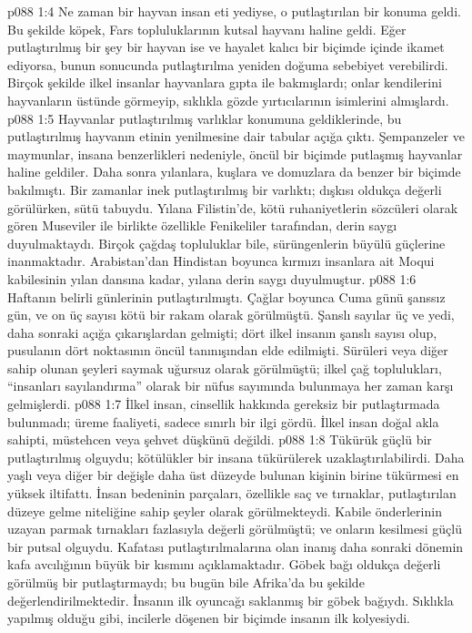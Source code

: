 \vs p088 1:4 Ne zaman bir hayvan insan eti yediyse, o putlaştırılan bir konuma geldi. Bu şekilde köpek, Fars topluluklarının kutsal hayvanı haline geldi. Eğer putlaştırılmış bir şey bir hayvan ise ve hayalet kalıcı bir biçimde içinde ikamet ediyorsa, bunun sonucunda putlaştırılma yeniden doğuma sebebiyet verebilirdi. Birçok şekilde ilkel insanlar hayvanlara gıpta ile bakmışlardı; onlar kendilerini hayvanların üstünde görmeyip, sıklıkla gözde yırtıcılarının isimlerini almışlardı.
\vs p088 1:5 Hayvanlar putlaştırılmış varlıklar konumuna geldiklerinde, bu putlaştırılmış hayvanın etinin yenilmesine dair tabular açığa çıktı. Şempanzeler ve maymunlar, insana benzerlikleri nedeniyle, öncül bir biçimde putlaşmış hayvanlar haline geldiler. Daha sonra yılanlara, kuşlara ve domuzlara da benzer bir biçimde bakılmıştı. Bir zamanlar inek putlaştırılmış bir varlıktı; dışkısı oldukça değerli görülürken, sütü tabuydu. Yılana Filistin’de, kötü ruhaniyetlerin sözcüleri olarak gören Museviler ile birlikte özellikle Fenikeliler tarafından, derin saygı duyulmaktaydı. Birçok çağdaş topluluklar bile, sürüngenlerin büyülü güçlerine inanmaktadır. Arabistan’dan Hindistan boyunca kırmızı insanlara ait Moqui kabilesinin yılan dansına kadar, yılana derin saygı duyulmuştur.
\vs p088 1:6 Haftanın belirli günlerinin putlaştırılmıştı. Çağlar boyunca Cuma günü şanssız gün, ve on üç sayısı kötü bir rakam olarak görülmüştü. Şanslı sayılar üç ve yedi, daha sonraki açığa çıkarışlardan gelmişti; dört ilkel insanın şanslı sayısı olup, pusulanın dört noktasının öncül tanınışından elde edilmişti. Sürüleri veya diğer sahip olunan şeyleri saymak uğursuz olarak görülmüştü; ilkel çağ toplulukları, “insanları sayılandırma” olarak bir nüfus sayımında bulunmaya her zaman karşı gelmişlerdi.
\vs p088 1:7 İlkel insan, cinsellik hakkında gereksiz bir putlaştırmada bulunmadı; üreme faaliyeti, sadece sınırlı bir ilgi gördü. İlkel insan doğal akla sahipti, müstehcen veya şehvet düşkünü değildi.
\vs p088 1:8 Tükürük güçlü bir putlaştırılmış olguydu; kötülükler bir insana tükürülerek uzaklaştırılabilirdi. Daha yaşlı veya diğer bir değişle daha üst düzeyde bulunan kişinin birine tükürmesi en yüksek iltifattı. İnsan bedeninin parçaları, özellikle saç ve tırnaklar, putlaştırılan düzeye gelme niteliğine sahip şeyler olarak görülmekteydi. Kabile önderlerinin uzayan parmak tırnakları fazlasıyla değerli görülmüştü; ve onların kesilmesi güçlü bir putsal olguydu. Kafatası putlaştırılmalarına olan inanış daha sonraki dönemin kafa avcılığının büyük bir kısmını açıklamaktadır. Göbek bağı oldukça değerli görülmüş bir putlaştırmaydı; bu bugün bile Afrika’da bu şekilde değerlendirilmektedir. İnsanın ilk oyuncağı saklanmış bir göbek bağıydı. Sıklıkla yapılmış olduğu gibi, incilerle döşenen bir biçimde insanın ilk kolyesiydi.
